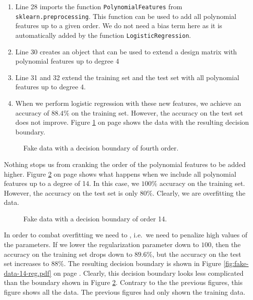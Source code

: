 \begin{enumerate}
\item Line 28 imports the function \texttt{PolynomialFeatures} from \texttt{sklearn.preprocessing}.
      This function can be used to add all polynomial features up to a given order.
      We do not need a bias term here as it is automatically added by the function \texttt{LogisticRegression}.
\item Line 30 creates an object that can be used to extend a design matrix with polynomial features up to degree 4
\item Line 31 and 32 extend the training set and the test set with all polynomial features up to degree 4.
\item When we perform logistic regression with these new features, we achieve an accuracy of $88.4\%$ on the
      training set.  However, the accuracy on the test set does not improve.
      Figure \ref{fig:fake-data-quartic.pdf} on page \pageref{fig:fake-data-quartic.pdf} shows the data with
      the resulting decision boundary.
\end{enumerate}
 
\begin{figure}[!th]
\caption{Fake data with a decision boundary of fourth order.}
\label{fig:fake-data-quartic.pdf}
\end{figure}

Nothing stops us from cranking the order of the polynomial features to be added higher.
Figure \ref{fig:fake-data-14.pdf} on page \pageref{fig:fake-data-14.pdf} shows what happens when we include all
polynomial features up to a degree of 14.  In this case, we $100\%$ accuracy on the training set.  However, the
accuracy on the test set is only $80\%$.  Clearly, we are overfitting the data.

\begin{figure}[!th]
\caption{Fake data with a decision boundary of order 14.}
\label{fig:fake-data-14.pdf}
\end{figure}

In order to combat overfitting we need to , i.e.~we need to penalize high values of the
parameters.  If we lower the regularization parameter down to $100$, then the accuracy on the training set
drops down to $89.6\%$, but the accuracy on the test set increases to $88\%$.  The resulting decision boundary
is shown in Figure \ref{fig:fake-data-14-reg.pdf} on page \pageref{fig:fake-data-14-reg.pdf}.  Clearly, this
decision boundary looks less complicated than the boundary shown in Figure \ref{fig:fake-data-14.pdf}.
Contrary to the the previous figures, this figure shows all the data.  The previous figures had only shown the
training data.

